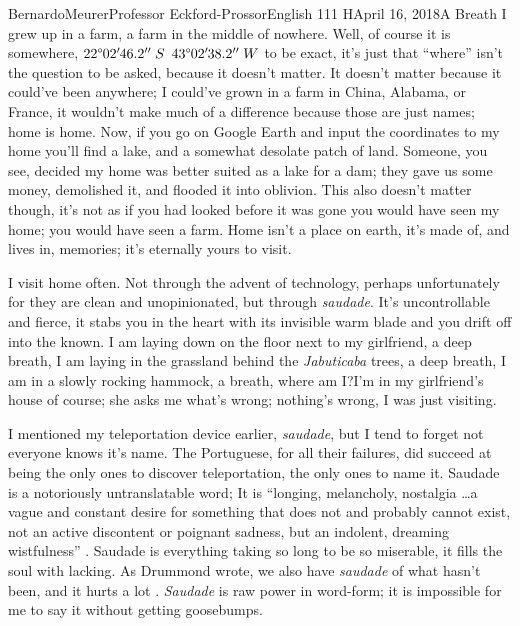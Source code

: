 \documentclass[12pt,letterpaper]{article}
\newcommand*{\aprime}{^{\prime}\mkern-1.2mu}
\newcommand*{\dprime}{^{\prime\prime}\mkern-1.2mu}
\begin{document}
\begin{mla}{Bernardo}{Meurer}{Professor Eckford-Prossor}{English 111 H}{April 16, 2018}{A Breath}
	I grew up in a farm, a farm in the middle of nowhere. Well, of course it is somewhere, \(22\degree 02\aprime 46.2\dprime\ S\enspace 43\degree 02\aprime 38.2\dprime\ W\) to be exact, it's just that ``where'' isn't the question to be asked, because it doesn't matter. It doesn't matter because it could've been anywhere; I could've grown in a farm in China, Alabama, or France, it wouldn't make much of a difference because those are just names; home is home. Now, if you go on Google Earth and input the coordinates to my home you'll find a lake, and a somewhat desolate patch of land. Someone, you see, decided my home was better suited as a lake for a dam; they gave us some money, demolished it, and flooded it into oblivion. This also doesn't matter though, it's not as if you had looked before it was gone you would have seen my home; you would have seen a farm. Home  isn't a place on earth, it's made of, and lives in, memories; it's eternally yours to visit.

	I visit home often. Not through the advent of technology, perhaps unfortunately for they are clean and unopinionated, but through \emph{saudade}. It's uncontrollable and fierce, it stabs you in the heart with its invisible warm blade and you drift off into the known. I am laying down on the floor next to my girlfriend, a deep breath, I am laying in the grassland behind the \emph{Jabuticaba} trees, a deep breath, I am in a slowly rocking hammock, a breath, where am I?\@ I'm in my girlfriend's house of course; she asks me what's wrong; nothing's wrong, I was just visiting.

	I mentioned my teleportation device earlier, \emph{saudade}, but I tend to forget not everyone knows it's name. The Portuguese, for all their failures, did succeed at being the only ones to discover teleportation, the only ones to name it. Saudade is a notoriously untranslatable word; It is ``longing, melancholy, nostalgia \ldots a vague and constant desire for something that does not and probably cannot exist, not an active discontent or poignant sadness, but an indolent, dreaming wistfulness'' \autocite{emmons_lewis_2008}. Saudade is everything taking so long to be so miserable, it fills the soul with lacking. As Drummond wrote, we also have \emph{saudade} of what hasn't been, and it hurts a lot \autocite{drummond_1987}. \emph{Saudade} is raw power in word-form; it is impossible for me to say it without getting goosebumps.


\end{mla}
\end{document}
